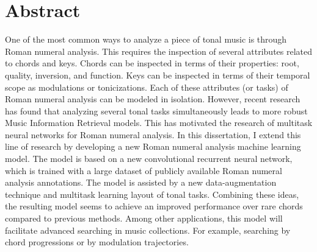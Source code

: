 \chapter*{Abstract}
\label{chap:abstract-en}

One of the most common ways to analyze a piece of tonal
music is through Roman numeral analysis. This requires the
inspection of several attributes related to chords and keys.
Chords can be inspected in terms of their properties: root,
quality, inversion, and function. Keys can be inspected in
terms of their temporal scope as modulations or
tonicizations. Each of these attributes (or tasks) of Roman
numeral analysis can be modeled in isolation. However,
recent research has found that analyzing several tonal tasks
simultaneously leads to more robust Music Information
Retrieval models. This has motivated the research of
multitask neural networks for Roman numeral analysis.
In this dissertation, I extend this line of research by
developing a new Roman numeral analysis machine learning
model. The model is based on a new convolutional recurrent
neural network, which is trained with a large dataset of
publicly available Roman numeral analysis annotations. The
model is assisted by a new data-augmentation technique and
multitask learning layout of tonal tasks. Combining these
ideas, the resulting model seems to achieve an improved
performance over rare chords compared to previous methods.
Among other applications, this model will facilitate
advanced searching in music collections. For example,
searching by chord progressions or by modulation
trajectories.
